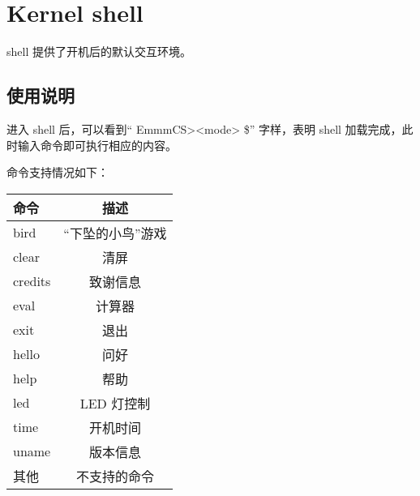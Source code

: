 %
%
%
%
%
%
%
%

\chapter{Kernel shell}

shell 提供了开机后的默认交互环境。\\

\section{使用说明}

进入 shell 后，可以看到“ {\color{green}EmmmCS>}{\color{red}<mode>} \$” 字样，表明 shell 加载完成，此时输入命令即可执行相应的内容。

命令支持情况如下：\\

\begin{tabular}{|l|c|}
    \hline
    命令    & 描述  \\\hline
    bird    & “下坠的小鸟”游戏  \\\hline
    clear   & 清屏  \\\hline
    credits & 致谢信息  \\\hline
    eval    & 计算器  \\\hline
    exit    & 退出  \\\hline
    hello   & 问好  \\\hline
    help    & 帮助  \\\hline
    led     & LED 灯控制  \\\hline
    time    & 开机时间  \\\hline
    uname   & 版本信息  \\\hline
    其他    & 不支持的命令  \\\hline
\end{tabular}

